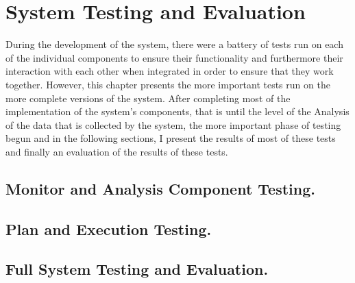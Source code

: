 \chapter{System Testing and Evaluation}\label{ch:mathtest} %

During the development of the system, there were a battery of tests run on each of the individual components to ensure their functionality and furthermore their interaction with each other when integrated in order to ensure that they work together. However, this chapter presents the more important tests run on the more complete versions of the system. After completing most of the implementation of the system's components, that is until the level of the Analysis of the data that is collected by the system, the more important phase of testing begun and in the following sections, I present the results of most of these tests and finally an evaluation of the results of these tests.

\section{Monitor and Analysis Component Testing.}

\section{Plan and Execution Testing.}

\section{Full System Testing and Evaluation.}
